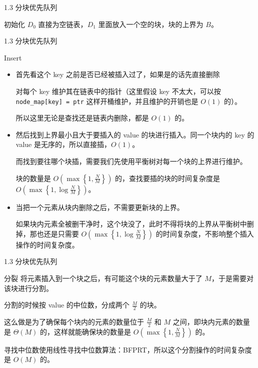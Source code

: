 \documentclass{beamer}
\begin{document}
\begin{frame}{1.3 分块优先队列}
  \begin{block}{初始化}
    $D_0$ 直接为空链表，$D_1$ 里面放入一个空的块，块的上界为 $B$。
  \end{block}
\end{frame}
\begin{frame}{1.3 分块优先队列}
  \begin{block}{Insert}
    \footnotesize
    \begin{itemize}
      \item 首先看这个 key 之前是否已经被插入过了，如果是的话先直接删除

      \pause
      对每个 key 维护其在链表中的指针（这里假设 key 不太大，可以按 \texttt{node\_map[key] = ptr} 这样开桶维护，并且维护的开销也是 $O(1)$ 的）。

      所以这里无论是查找还是链表内删除，都是 $O(1)$ 的。

      \pause
      \item 然后找到上界最小且大于要插入的 value 的块进行插入。同一个块内的 key 的 value 是无序的，所以直接插，$O(1)$。

      \pause
      而找到要往哪个块插，需要我们先使用平衡树对每一个块的上界进行维护。

      \pause
      块的数量是 $O(\max\left \{ 1, \frac{N}{M} \right \})$ 的，查找要插的块的时间复杂度是 $O(\max\left\{ 1, \log \frac{N}{M} \right\})$。

      \pause
      \item 当把一个元素从块内删除之后，不需要更新块的上界。

      \pause
      如果块内元素全被删干净时，这个块没了，此时不得将块的上界从平衡树中删掉，那也还是只需要 $O(\max\left\{ 1, \log \frac{N}{M} \right\})$ 的时间复杂度，不影响整个插入操作的时间复杂度。
    \end{itemize}
  \end{block}
\end{frame}

\begin{frame}{1.3 分块优先队列}
  \begin{block}{分裂}
    将元素插入到一个块之后，有可能这个块的元素数量大于了 $M$，于是需要对该块进行分割。

    \vspace{0.35em}\pause
    分割的时候按 value 的中位数，分成两个 $\frac{M}{2}$ 的块。

    \vspace{0.35em}\pause
    这么做是为了确保每个块内的元素的数量位于 $\frac{M}{2}$ 和 $M$ 之间，即块内元素的数量是 $\Theta(M)$ 的，这样就能确保块的数量是 $O(\max\left \{ 1, \frac{N}{M} \right \})$ 的。

    \vspace{0.35em}\pause
    寻找中位数使用线性寻找中位数算法：BFPRT，所以这个分割操作的时间复杂度是 $O(M)$ 的。
  \end{block}
\end{frame}
\end{document}
